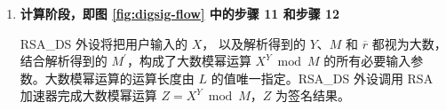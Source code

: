 \documentclass[main\_\_CN.tex]{subfiles}
\begin{document}
\begin{enumerate}
        RSA\_DS 外设会执行两种校验操作： MD 校验和填充 (padding) 校验。
        由于填充校验和 MD 校验同步进行， 因此填充校验不在图 \ref{fig:digsig-flow} 中体现。


        \begin{itemize}

            \item MD 校验 —— RSA\_DS 外设调用 SHA-256 进行哈希计算获取哈希结果值 \begin{math}[CALC\_MD]_{256}\end{math}（即步骤 4），然后将 \begin{math}[CALC\_MD]_{256}\end{math} 与 MD 校验码 \begin{math}[MD]_{256}\end{math} 作比较，当且仅当二者相同时，MD 校验通过。

            \item 填充校验 —— RSA\_DS 外设将检查解析阶段解析出的 追加码 \begin{math}[\beta]_{64} \end{math} 是否符合 PKCS\#7 标准，当且仅当符合标准时，填充校验通过。

        \end{itemize}

        如果 MD 校验通过，RSA\_DS 外设将执行后续计算；否则 RSA\_DS 外设拒绝执行。
        如果填充校验失败，将生成警告信息，但不会影响 RSA\_DS 外设的后续操作。

    \item {\bfseries 计算阶段，即图 \ref{fig:digsig-flow} 中的步骤 11 和步骤 12}

        RSA\_DS 外设将把用户输入的 \begin{math}X\end{math}，
        以及解析得到的 \begin{math}Y\end{math}、\begin{math}M\end{math} 和 \begin{math}\overline{r}\end{math} 都视为大数，结合解析得到的 \begin{math}M^{\prime}\end{math}，构成了大数模幂运算 \begin{math} X^{Y} \bmod M\end{math} 的所有必要输入参数。大数模幂运算的运算长度由 \begin{math}L\end{math} 的值唯一指定。RSA\_DS 外设调用 RSA 加速器完成大数模幂运算 \begin{math}Z = X^{Y} \bmod M\end{math}，\begin{math}Z\end{math} 为签名结果。

\end{enumerate}
\end{document}
